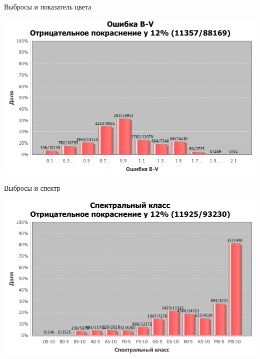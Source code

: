 \documentclass[14pt, fleqn, xcolor={dvipsnames, table}]{beamer}
\begin{document}
        \begin{frame}{Выбросы и показатель цвета}
            \begin{center}
                \includegraphics[scale=0.49]{outlier-bv.png}
            \end{center}             
        \end{frame}   
        
        \begin{frame}{Выбросы и спектр}
            \begin{center}
                \includegraphics[scale=0.49]{outlier-spect.png}
            \end{center}             
        \end{frame}  
        
\end{document}
